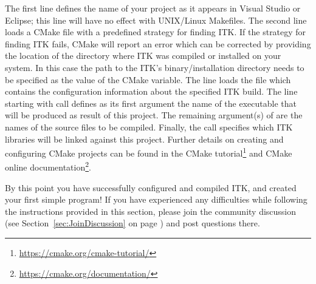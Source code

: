 The first line defines the name of your project as it appears in Visual Studio
or Eclipse; this line will have no effect with UNIX/Linux Makefiles. The second
line loads a CMake file with a predefined strategy for finding ITK. If the
strategy for finding ITK fails, CMake will report an error which can be
corrected by providing the location of the directory where ITK was compiled or
installed on your system. In this case the path to the ITK's binary/installation
directory needs to be specified as the value of the  CMake
variable. The line  loads the
 file which contains the configuration information about the
specified ITK build. The line starting with  call defines
as its first argument the name of the executable that will be produced
as result of this project. The remaining argument(s) of 
are the names of the source files to be compiled. Finally, the
 call specifies which ITK libraries will be
linked against this project. Further details on creating and configuring CMake
projects can be found in the CMake tutorial\footnote{
\url{https://cmake.org/cmake-tutorial/}} and CMake online
documentation\footnote{\url{https://cmake.org/documentation/}}.



By this point you have successfully configured and compiled ITK, and created
your first simple program! If you have experienced any difficulties while
following the instructions provided in this section, please join the community
discussion (see Section~\ref{sec:JoinDiscussion} on
page \pageref{sec:JoinDiscussion}) and post questions there.
